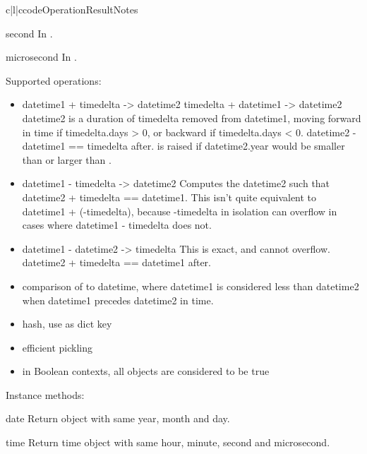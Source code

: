 \begin{tableiii}{c|l|c}{code}{Operation}{Result}{Notes}
\begin{memberdesc}{second}
In .
\end{memberdesc}

\begin{memberdesc}{microsecond}
In .
\end{memberdesc}

Supported operations:

\begin{itemize}
  \item
    datetime1 + timedelta -> datetime2
    timedelta + datetime1 -> datetime2
    datetime2 is a duration of timedelta removed from datetime1, moving
    forward in time if timedelta.days > 0, or backward if
    timedelta.days < 0.  datetime2 - datetime1 == timedelta after.
     is raised if datetime2.year would be
    smaller than  or larger than .

  \item
    datetime1 - timedelta -> datetime2
    Computes the datetime2 such that datetime2 + timedelta == datetime1.
    This isn't quite equivalent to datetime1 + (-timedelta), because
    -timedelta in isolation can overflow in cases where
    datetime1 - timedelta does not.

  \item
    datetime1 - datetime2 -> timedelta
    This is exact, and cannot overflow.
    datetime2 + timedelta == datetime1 after.

  \item
    comparison of  to datetime, where datetime1 is
    considered less than datetime2 when datetime1 precedes datetime2
    in time.

  \item
    hash, use as dict key

  \item
    efficient pickling

  \item
    in Boolean contexts, all  objects are considered
    to be true
\end{itemize}

Instance methods:

\begin{methoddesc}{date}{}
    Return  object with same year, month and day.
\end{methoddesc}

\begin{methoddesc}{time}{}
    Return time object with same hour, minute, second and microsecond.
\end{methoddesc}


\end{tableiii}
